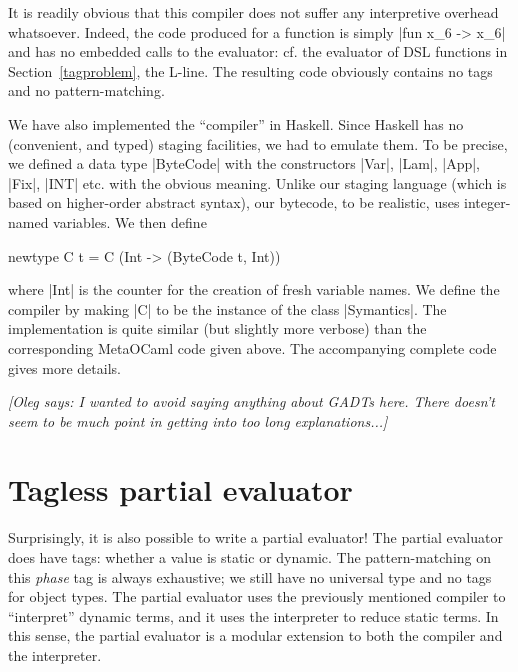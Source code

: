\documentclass[preprint]{sigplanconf}
\newcommand{\oleg}[1]{{\it [Oleg says: #1]}}
\begin{document}
\begin{comment}
\oleg{one may wish to give the folloiwng example too; the code
  expression can be somewhat abbreviated...}
\begin{code}
  let module E = EX(C) in E.testpowfix7;;
# - : ('_a, int -> int) C.repr =
.<fun x_1 ->
   (((fun x_2 ->
       let rec self_3 =
        fun n_4 ->
         ((fun x_5 -> if (x_5 <= 0) then 1 else (x_2 * (self_3 (x_5 + (-1)))))
           n_4) in
       self_3) x_1) 7)>.
\end{code}
\end{comment}

\noindent It is readily obvious that this compiler does not suffer
any interpretive overhead whatsoever. Indeed, the
  code produced for a function is simply |fun x_6 -> x_6| and has no 
  embedded calls to the evaluator: cf. the evaluator of DSL functions
  in Section~\ref{tagproblem}, the L-line.
The resulting code obviously contains no tags and no pattern-matching.

We have also implemented the ``compiler'' in Haskell. Since Haskell
has no (convenient, and typed) staging facilities, we had to emulate
them. To be precise, we defined a data type |ByteCode| with the
constructors |Var|, |Lam|, |App|, |Fix|, |INT| etc. with the obvious
meaning. Unlike our staging language (which is based on higher-order
abstract syntax), our bytecode, to be realistic, uses integer-named
variables. We then define 
\begin{code}
  newtype C t = C (Int -> (ByteCode t, Int)) 
\end{code}
where |Int| is the counter for the creation of fresh variable
names. We define the compiler by making |C| to be the instance of the
class |Symantics|. The implementation is quite similar (but slightly more
verbose) than the corresponding MetaOCaml code given above. The
accompanying complete code gives more details.

\oleg{I wanted to avoid saying anything about GADTs here. There
  doesn't seem to be much point in getting into too long
  explanations...}



\section{Tagless partial evaluator}\label{PE}

Surprisingly, it is also possible to write a partial evaluator!  The
partial evaluator does have tags: whether a value is static or dynamic.
The pattern-matching on this \emph{phase} tag is always exhaustive; we still
have no universal type and no tags for object types.  The partial
evaluator uses the previously mentioned compiler to ``interpret'' dynamic
terms, and it uses the interpreter to reduce static terms.  In this sense, 
the partial evaluator is a modular extension to both the compiler and
the interpreter. 
\end{document}

